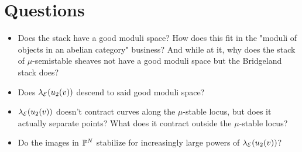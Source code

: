 \documentclass[letterpaper,10pt]{article}
\theoremstyle{remark}
\begin{document}
\section{Questions}
\begin{itemize}
    \item Does the stack have a good moduli space? How does this fit in the "moduli of objects in an abelian category" business? And while at it, why does the stack of $\mu$-semistable sheaves not have a good moduli space but the Bridgeland stack does?
    \item Does $\lambda_{\mathcal{E}}(u_2(v))$ descend to said good moduli space?
    \item $\lambda_{\mathcal{E}}(u_2(v))$ doesn't contract curves along the $\mu$-stable locus, but does it actually separate points? What does it contract outside the $\mu$-stable locus?
    \item Do the images in $\mathbb{P}^N$ stabilize for increasingly large powers of $\lambda_{\mathcal{E}}(u_2(v))$?
\end{itemize}



\end{document}

